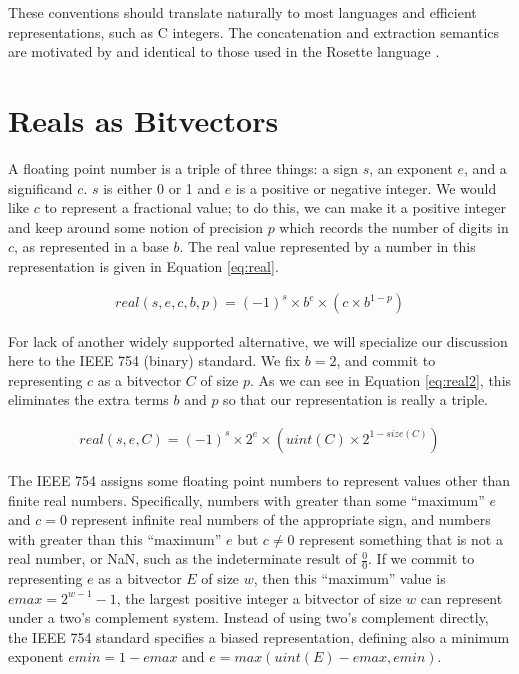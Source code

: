 \documentclass[letterpaper,10pt]{article}
\begin{document}
These conventions should translate naturally to most languages and efficient representations, such as C integers. The concatenation and extraction semantics are motivated by and identical to those used in the Rosette language \cite{rosette}.

\section{Reals as Bitvectors}

A floating point number is a triple of three things: a sign $s$, an exponent $e$, and a significand $c$. $s$ is either 0 or 1 and $e$ is a positive or negative integer. We would like $c$ to represent a fractional value; to do this, we can make it a positive integer and keep around some notion of precision $p$ which records the number of digits in $c$, as represented in a base $b$. The real value represented by a number in this representation is given in Equation \ref{eq:real}.

\begin{align} \label{eq:real}
 real(s, e, c, b, p) = (-1)^s \times b^e \times (c \times b^{1 - p})
\end{align}

For lack of another widely supported alternative, we will specialize our discussion here to the IEEE 754 (binary) standard. We fix $b = 2$, and commit to representing $c$ as a bitvector $C$ of size $p$. As we can see in Equation \ref{eq:real2}, this eliminates the extra terms $b$ and $p$ so that our representation is really a triple.

\begin{align} \label{eq:real2}
 real(s, e, C) = (-1)^s \times 2^e \times (uint(C) \times 2^{1 - size(C)})
\end{align}

The IEEE 754 assigns some floating point numbers to represent values other than finite real numbers. Specifically, numbers with greater than some ``maximum'' $e$ and $c = 0$ represent infinite real numbers of the appropriate sign, and numbers with greater than this ``maximum'' $e$ but $c \neq 0$ represent something that is not a real number, or NaN, such as the indeterminate result of $\frac{0}{0}$. If we commit to representing $e$ as a bitvector $E$ of size $w$, then this ``maximum'' value is $emax = 2^{w-1} - 1$, the largest positive integer a bitvector of size $w$ can represent under a two's complement system. Instead of using two's complement directly, the IEEE 754 standard specifies a biased representation, defining also a minimum exponent $emin = 1 - emax$ and $e = max(uint(E) - emax, emin)$.
\end{document}
